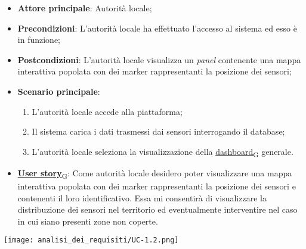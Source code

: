 \begin{itemize}
	\item \textbf{Attore principale}: Autorità locale;
	\item \textbf{Precondizioni}: L'autorità locale ha effettuato l'accesso al sistema ed esso è in funzione;
	\item \textbf{Postcondizioni}: L'autorità locale visualizza un \textit{panel} contenente una mappa interattiva
	      popolata con dei marker rappresentanti la posizione dei sensori;
	\item \textbf{Scenario principale}:
	      \begin{enumerate}
		      \item L'autorità locale accede alla piattaforma;
		      \item Il sistema carica i dati trasmessi dai sensori interrogando il database;
		      \item L'autorità locale seleziona la visualizzazione della \href{https://7last.github.io/docs/rtb/documentazione-interna/glossario\#dashboard}{dashboard\textsubscript{G}} generale.
	      \end{enumerate}
	\item \href{https://7last.github.io/docs/rtb/documentazione-interna/glossario\#user-story}{\textbf{User story}\textsubscript{G}}: Come autorità locale desidero poter visualizzare una mappa interattiva popolata con dei marker rappresentanti
	      la posizione dei sensori e contenenti il loro identificativo. Essa mi consentirà di visualizzare la distribuzione dei sensori nel territorio
	      ed eventualmente interventire nel caso in cui siano presenti zone non coperte.
\end{itemize}
\begin{center}
	\texttt{[image: analisi\_dei\_requisiti/UC-1.2.png]}
\end{center}

